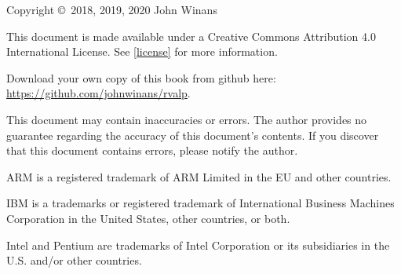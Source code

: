 \thispagestyle{plain}

Copyright \copyright\ 2018, 2019, 2020 John Winans 

This document is made available under a Creative Commons Attribution 4.0 
International License.  See \autoref{license} for more information.

Download your own copy of this book from github here: 
\url{https://github.com/johnwinans/rvalp}.

This document may contain inaccuracies or errors.  The author provides no 
guarantee regarding the accuracy of this document's contents.  If you 
discover that this document contains errors, please notify the author.



ARM\rtm{} is a registered trademark of ARM Limited in the 
EU and other countries.

IBM\rtm{} is a trademarks or registered trademark of International Business Machines 
Corporation in the United States, other countries, or both.

Intel\rtm{} and Pentium\rtm{} are trademarks of Intel Corporation or its subsidiaries 
in the U.S. and/or other countries.
